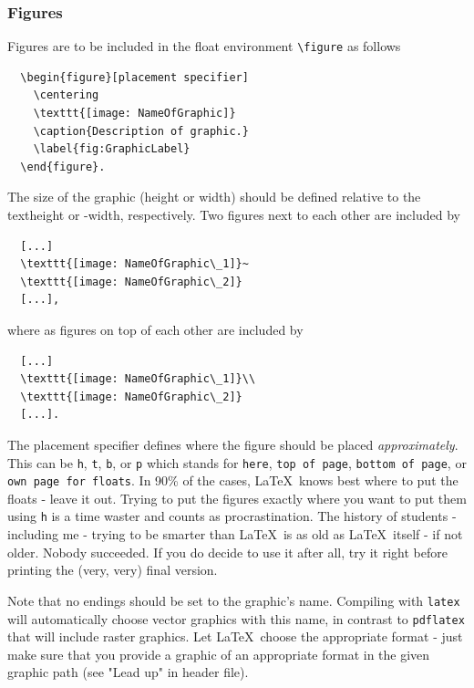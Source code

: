 \documentclass[12pt,a4paper]{article}
\begin{document}
\subsubsection{Figures}
\label{sec:fig}

Figures are to be included in the float environment \verb!\figure! as follows

\begin{verbatim}
  \begin{figure}[placement specifier]
    \centering
    \texttt{[image: NameOfGraphic]}
    \caption{Description of graphic.}
    \label{fig:GraphicLabel}
  \end{figure}.
\end{verbatim}

The size of the graphic (height or width) should be defined relative to the
textheight or -width, respectively. Two figures next to each other are
included by 

\begin{verbatim}
  [...]
  \texttt{[image: NameOfGraphic\_1]}~
  \texttt{[image: NameOfGraphic\_2]}
  [...],
\end{verbatim}
where as figures on top of each other are included by

\begin{verbatim}
  [...]
  \texttt{[image: NameOfGraphic\_1]}\\
  \texttt{[image: NameOfGraphic\_2]}
  [...].
\end{verbatim}

The placement specifier defines where the figure should be placed
\emph{approximately}. This can be \verb!h!, \verb!t!, \verb!b!, or \verb!p!
which stands for \verb!here!, \verb!top of page!, \verb!bottom of page!, or
\verb!own page for floats!. In 90\% of the cases, \LaTeX~knows best where to
put the floats - leave it out. Trying to put the figures exactly where you
want to put them using \verb!h! is a time waster and counts as
procrastination. The history of students - including me - trying to be smarter
than \LaTeX~is as old as \LaTeX~itself - if not older. Nobody succeeded. 
If you do decide to use it after all, try it right before printing the (very, very) final version.

Note that no endings should be set to the graphic's name. Compiling with
\verb!latex! will automatically choose vector graphics with this name, in
contrast to \verb!pdflatex! that will include raster graphics. Let
\LaTeX~choose the appropriate format - just make sure that you provide a
graphic of an appropriate format in the given graphic path (see "Lead up" in
header file).
\end{document}
